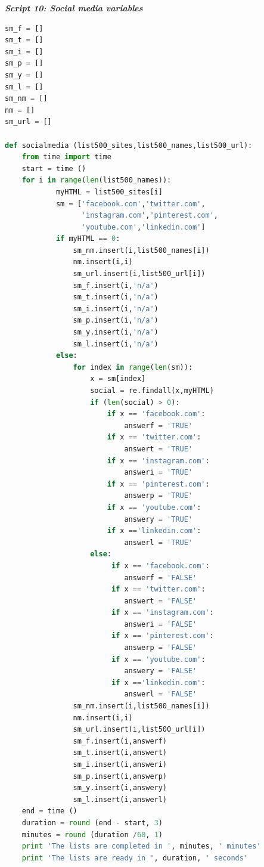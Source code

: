 \documentclass{article}
\begin{document}
\begin{center}
\textit{\textbf{Script 10: Social media variables}}\label{p10}
\end{center}
\begin{lstlisting}[language=Python]
sm_f = []
sm_t = []
sm_i = []
sm_p = []
sm_y = []
sm_l = []   
sm_nm = [] 
nm = []
sm_url = []
 
def socialmedia (list500_sites,list500_names,list500_url):
    from time import time 
    start = time ()
    for i in range(len(list500_names)):        
            myHTML = list500_sites[i]
            sm = ['facebook.com','twitter.com',
                  'instagram.com','pinterest.com',
                  'youtube.com','linkedin.com'] 
            if myHTML == 0:
                sm_nm.insert(i,list500_names[i]) 
                nm.insert(i,i)
                sm_url.insert(i,list500_url[i])
                sm_f.insert(i,'n/a')
                sm_t.insert(i,'n/a')
                sm_i.insert(i,'n/a')
                sm_p.insert(i,'n/a')
                sm_y.insert(i,'n/a')
                sm_l.insert(i,'n/a')
            else:
                for index in range(len(sm)):
                    x = sm[index]
                    social = re.findall(x,myHTML)                                
                    if (len(social) > 0):
                        if x == 'facebook.com':
                            answerf = 'TRUE'
                        if x == 'twitter.com':
                            answert = 'TRUE'
                        if x == 'instagram.com':
                            answeri = 'TRUE'
                        if x == 'pinterest.com':
                            answerp = 'TRUE'
                        if x == 'youtube.com':
                            answery = 'TRUE'
                        if x =='linkedin.com':
                            answerl = 'TRUE'                   
                    else:
                         if x == 'facebook.com':
                            answerf = 'FALSE'
                         if x == 'twitter.com':
                            answert = 'FALSE'
                         if x == 'instagram.com':
                            answeri = 'FALSE'
                         if x == 'pinterest.com':
                            answerp = 'FALSE'
                         if x == 'youtube.com':
                            answery = 'FALSE'
                         if x =='linkedin.com':
                            answerl = 'FALSE'                
                sm_nm.insert(i,list500_names[i]) 
                nm.insert(i,i)
                sm_url.insert(i,list500_url[i])
                sm_f.insert(i,answerf)
                sm_t.insert(i,answert)
                sm_i.insert(i,answeri)
                sm_p.insert(i,answerp)
                sm_y.insert(i,answery)
                sm_l.insert(i,answerl)
    end = time ()
    duration = round (end - start, 3)
    minutes = round (duration /60, 1)
    print 'The lists are completed in ', minutes, ' minutes' 
    print 'The lists are ready in ', duration, ' seconds'
 

\end{lstlisting}
\end{document}
